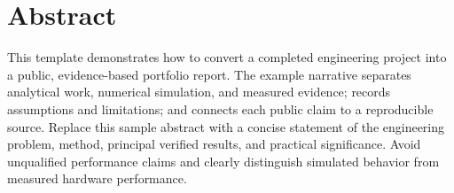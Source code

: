 \chapter*{Abstract}

This template demonstrates how to convert a completed engineering project into a
public, evidence-based portfolio report. The example narrative separates analytical
work, numerical simulation, and measured evidence; records assumptions and
limitations; and connects each public claim to a reproducible source. Replace this
sample abstract with a concise statement of the engineering problem, method,
principal verified results, and practical significance. Avoid unqualified performance
claims and clearly distinguish simulated behavior from measured hardware performance.
